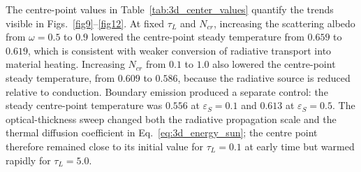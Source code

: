 \documentclass[a4paper,12pt]{ctexart}
\numberwithin{equation}{section}
\begin{document}
\begin{table}[H]
\centering
\scriptsize
\caption{Representative centre-point temperatures from the current three-dimensional cubical-enclosure calculations. Values are hot-wall-normalised temperatures at $X=0.5$, $Y=0.5$, and $Z=0.5$. The baseline is $\tau_L=1.0$, $\omega=0$, $N_{cr}=0.01$, and $\varepsilon=1.0$. Here, n.r. indicates that the intermediate time was not retained for that run.}
\label{tab:3d_center_values}
\end{table}

The centre-point values in Table~\ref{tab:3d_center_values} quantify the trends visible in Figs.~\ref{fig9}--\ref{fig12}. At fixed $\tau_L$ and $N_{cr}$, increasing the scattering albedo from $\omega=0.5$ to $0.9$ lowered the centre-point steady temperature from $0.659$ to $0.619$, which is consistent with weaker conversion of radiative transport into material heating. Increasing $N_{cr}$ from $0.1$ to $1.0$ also lowered the centre-point steady temperature, from $0.609$ to $0.586$, because the radiative source is reduced relative to conduction. Boundary emission produced a separate control: the steady centre-point temperature was $0.556$ at $\varepsilon_S=0.1$ and $0.613$ at $\varepsilon_S=0.5$. The optical-thickness sweep changed both the radiative propagation scale and the thermal diffusion coefficient in Eq.~\eqref{eq:3d_energy_sun}; the centre point therefore remained close to its initial value for $\tau_L=0.1$ at early time but warmed rapidly for $\tau_L=5.0$.
\end{document}
